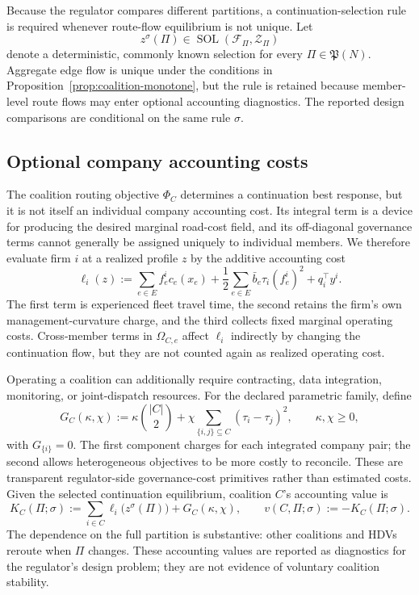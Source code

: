Because the regulator compares different partitions, a continuation-selection rule is required whenever route-flow equilibrium is not unique. Let
\begin{equation}\label{eq:continuation-selection}
 z^\sigma(\Pi)\in\operatorname{SOL}(\mathcal F_\Pi,\mathcal Z_\Pi)
\end{equation}
denote a deterministic, commonly known selection for every $\Pi\in\mathfrak P(N)$. Aggregate edge flow is unique under the conditions in Proposition~\ref{prop:coalition-monotone}, but the rule is retained because member-level route flows may enter optional accounting diagnostics. The reported design comparisons are conditional on the same rule $\sigma$.

\subsection{Optional company accounting costs}\label{sec:model_private_costs}

The coalition routing objective $\Phi_C$ determines a continuation best response, but it is not itself an individual company accounting cost. Its integral term is a device for producing the desired marginal road-cost field, and its off-diagonal governance terms cannot generally be assigned uniquely to individual members. We therefore evaluate firm $i$ at a realized profile $z$ by the additive accounting cost
\begin{equation}\label{eq:individual-accounting-cost}
 \ell_i(z)
 :=\sum_{e\in E}f_e^i c_e(x_e)
 +\frac12\sum_{e\in E}\bar b_e\tau_i(f_e^i)^2
 +q_i^\top y^i.
\end{equation}
The first term is experienced fleet travel time, the second retains the firm's own management-curvature charge, and the third collects fixed marginal operating costs. Cross-member terms in $\Omega_{C,e}$ affect $\ell_i$ indirectly by changing the continuation flow, but they are not counted again as realized operating cost.

Operating a coalition can additionally require contracting, data integration, monitoring, or joint-dispatch resources. For the declared parametric family, define
\begin{equation}\label{eq:coalition-governance-cost}
 G_C(\kappa,\chi)
 :=\kappa\binom{|C|}{2}
 +\chi\sum_{\{i,j\}\subseteq C}(\tau_i-\tau_j)^2,
 \qquad \kappa,\chi\geq0,
\end{equation}
with $G_{\{i\}}=0$. The first component charges for each integrated company pair; the second allows heterogeneous objectives to be more costly to reconcile. These are transparent regulator-side governance-cost primitives rather than estimated costs. Given the selected continuation equilibrium, coalition $C$'s accounting value is
\begin{equation}\label{eq:coalition-private-value}
 K_C(\Pi;\sigma)
 :=\sum_{i\in C}\ell_i\bigl(z^\sigma(\Pi)\bigr)+G_C(\kappa,\chi),
 \qquad
 v(C,\Pi;\sigma):=-K_C(\Pi;\sigma).
\end{equation}
The dependence on the full partition is substantive: other coalitions and HDVs reroute when $\Pi$ changes. These accounting values are reported as diagnostics for the regulator's design problem; they are not evidence of voluntary coalition stability.

